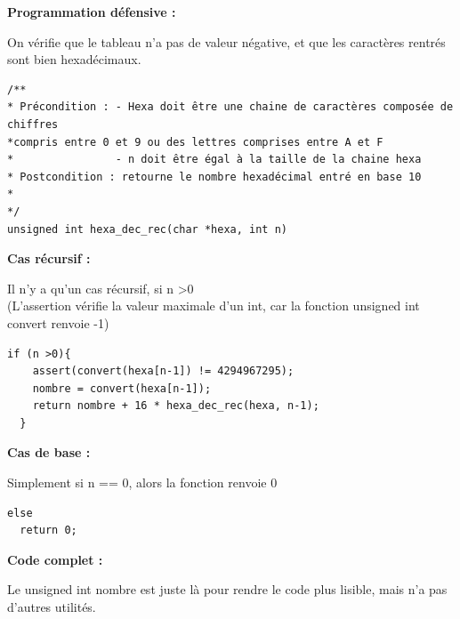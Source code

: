 \documentclass[a4paper, 11pt, oneside]{article}
\begin{document}
\begin{flushleft}
    \bf
    Programmation défensive :
\end{flushleft}

On vérifie que le tableau n'a pas de valeur négative, et que les caractères rentrés sont bien hexadécimaux.

\begin{lstlisting}[caption={Programmation défensive}]
/**
* Précondition : - Hexa doit être une chaine de caractères composée de chiffres
*compris entre 0 et 9 ou des lettres comprises entre A et F
*                - n doit être égal à la taille de la chaine hexa
* Postcondition : retourne le nombre hexadécimal entré en base 10
*
*/
unsigned int hexa_dec_rec(char *hexa, int n)

\end{lstlisting}




\begin{flushleft}
    \bf
    Cas récursif :
\end{flushleft}

Il n'y a qu'un cas récursif, si n >0\\
(L'assertion vérifie la valeur maximale d'un int, car la fonction unsigned int convert renvoie -1)

\begin{lstlisting}[caption={Cas récursif}]
  if (n >0){
    assert(convert(hexa[n-1]) != 4294967295);
    nombre = convert(hexa[n-1]);
    return nombre + 16 * hexa_dec_rec(hexa, n-1);
  }

\end{lstlisting}


\begin{flushleft}
    \bf
    Cas de base :
\end{flushleft}

Simplement si n == 0, alors la fonction renvoie 0

\begin{lstlisting}[caption={Cas de base}]
else
  return 0;

\end{lstlisting}



\begin{flushleft}
    \bf
    Code complet :
\end{flushleft}

Le unsigned int nombre est juste là pour rendre le code plus lisible, mais n'a pas d'autres utilités.
\end{document}
